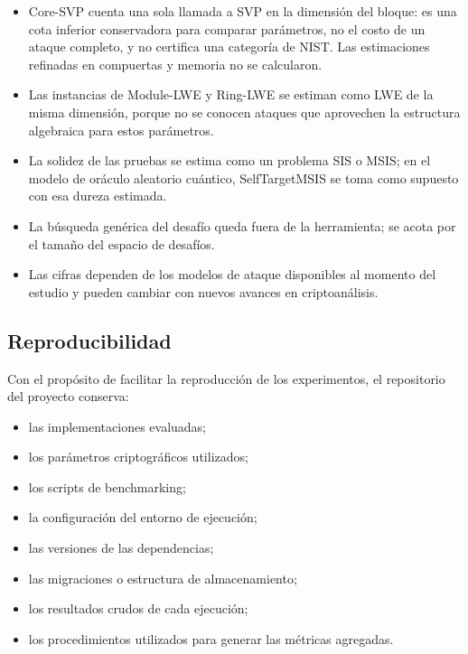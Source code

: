 \begin{itemize}
    \item Core-SVP cuenta una sola llamada a SVP en la dimensión del bloque: es una cota
    inferior conservadora para comparar parámetros, no el costo de un ataque completo, y no
    certifica una categoría de NIST. Las estimaciones refinadas en compuertas y memoria no
    se calcularon.
    \item Las instancias de Module-LWE y Ring-LWE se estiman como LWE de la misma
    dimensión, porque no se conocen ataques que aprovechen la estructura algebraica para
    estos parámetros.
    \item La solidez de las pruebas se estima como un problema SIS o MSIS; en el modelo de
    oráculo aleatorio cuántico, SelfTargetMSIS se toma como supuesto con esa dureza
    estimada.
    \item La búsqueda genérica del desafío queda fuera de la herramienta; se acota por el
    tamaño del espacio de desafíos.
    \item Las cifras dependen de los modelos de ataque disponibles al momento del estudio y
    pueden cambiar con nuevos avances en criptoanálisis.
\end{itemize}


\subsection{Reproducibilidad}
\label{sec:reproducibility}

Con el propósito de facilitar la reproducción de los experimentos, el repositorio del
proyecto conserva:

\begin{itemize}
    \item las implementaciones evaluadas;
    \item los parámetros criptográficos utilizados;
    \item los scripts de benchmarking;
    \item la configuración del entorno de ejecución;
    \item las versiones de las dependencias;
    \item las migraciones o estructura de almacenamiento;
    \item los resultados crudos de cada ejecución;
    \item los procedimientos utilizados para generar las métricas agregadas.
\end{itemize}

